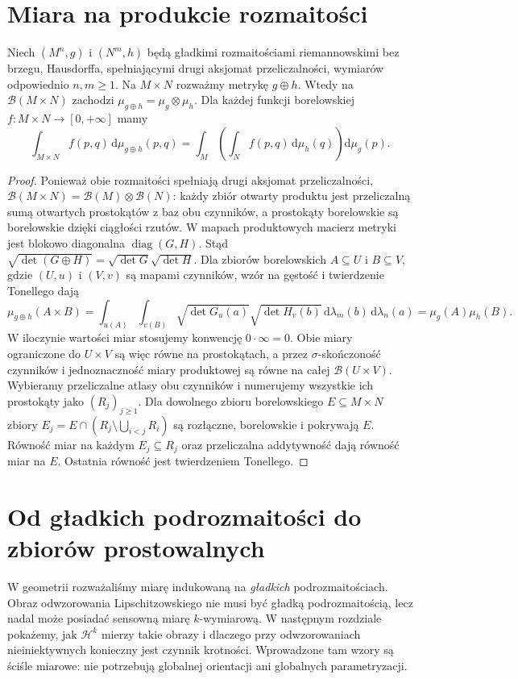 \section{Miara na produkcie rozmaitości}
\begin{twierdzenie}
\label{thm:product-riemann-27}
Niech $(M^n,g)$ i $(N^m,h)$ będą gładkimi rozmaitościami
riemannowskimi bez brzegu, Hausdorffa, spełniającymi drugi
aksjomat przeliczalności, wymiarów odpowiednio $n,m\ge1$. Na $M\times N$ rozważmy metrykę
$g\oplus h$. Wtedy na $\mathcal B(M\times N)$
zachodzi $\mu_{g\oplus h}=\mu_g\otimes\mu_h$.
Dla każdej funkcji borelowskiej $f:M\times N\to[0,+\infty]$ mamy
\[
 \int_{M\times N} f(p,q)\,\mathrm d\mu_{g\oplus h}(p,q)
 =\int_M\!\left(\int_N f(p,q)\,\mathrm d\mu_h(q)\right)
   \mathrm d\mu_g(p).
\]
\end{twierdzenie}
\begin{proof}
Ponieważ obie rozmaitości spełniają drugi aksjomat przeliczalności,
$\mathcal B(M\times N)=\mathcal B(M)\otimes\mathcal B(N)$:
każdy zbiór otwarty produktu jest przeliczalną sumą otwartych
prostokątów z baz obu czynników, a prostokąty borelowskie są
borelowskie dzięki ciągłości rzutów.
W mapach produktowych macierz metryki jest
blokowo diagonalna $\operatorname{diag}(G,H)$.
Stąd $\sqrt{\det(G\oplus H)}=
\sqrt{\det G}\sqrt{\det H}$. Dla zbiorów borelowskich $A\subseteq U$ i $B\subseteq V$,
gdzie $(U,u)$ i $(V,v)$ są mapami czynników, wzór na
gęstość i twierdzenie Tonellego dają
\[
 \mu_{g\oplus h}(A\times B)=
 \int_{u(A)}\int_{v(B)}
 \sqrt{\det G_u(a)}\sqrt{\det H_v(b)}
 \,\mathrm d\lambda_m(b)\,\mathrm d\lambda_n(a)
 =\mu_g(A)\mu_h(B).
\]
W iloczynie wartości miar stosujemy konwencję $0\cdot\infty=0$.
Obie miary ograniczone do $U\times V$ są więc równe
na prostokątach, a przez $\sigma$-skończoność czynników
i jednoznaczność miary produktowej są równe na całej
$\mathcal B(U\times V)$. Wybieramy przeliczalne atlasy
obu czynników i numerujemy wszystkie ich prostokąty
jako $(R_j)_{j\ge1}$. Dla dowolnego zbioru borelowskiego
$E\subseteq M\times N$ zbiory
$E_j=E\cap(R_j\setminus\bigcup_{i<j}R_i)$ są rozłączne,
borelowskie i pokrywają $E$. Równość miar na każdym
$E_j\subseteq R_j$ oraz przeliczalna addytywność
dają równość miar na $E$.
Ostatnia równość jest twierdzeniem Tonellego.
\end{proof}

\section{Od gładkich podrozmaitości do zbiorów prostowalnych}
W geometrii rozważaliśmy miarę indukowaną
na \emph{gładkich} podrozmaitościach. Obraz
odwzorowania Lipschitzowskiego nie musi być
gładką podrozmaitością, lecz nadal może
posiadać sensowną miarę $k$-wymiarową.
W następnym rozdziale pokażemy, jak
$\mathcal H^k$ mierzy takie obrazy i dlaczego
przy odwzorowaniach nieiniektywnych konieczny
jest czynnik krotności. Wprowadzone tam wzory
są ściśle miarowe: nie potrzebują globalnej
orientacji ani globalnych parametryzacji.
